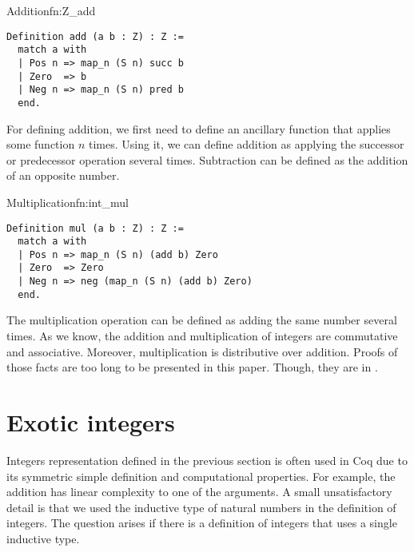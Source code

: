 \begin{func}{Addition}{fn:Z_add}
\begin{verbatim}
Definition add (a b : Z) : Z :=
  match a with 
  | Pos n => map_n (S n) succ b
  | Zero  => b
  | Neg n => map_n (S n) pred b
  end.
\end{verbatim}
\end{func}
For defining addition, we first need to define an ancillary function that applies some function $n$ times. Using it, we can define addition as applying the successor or predecessor operation several times. Subtraction can be defined as the addition of an opposite number.
\begin{func}{Multiplication}{fn:int_mul}
\begin{verbatim}
Definition mul (a b : Z) : Z :=
  match a with 
  | Pos n => map_n (S n) (add b) Zero
  | Zero  => Zero
  | Neg n => neg (map_n (S n) (add b) Zero)
  end.
\end{verbatim}
\end{func}
The multiplication operation can be defined as adding the same number several times. As we know, the addition and multiplication of integers are commutative and associative. Moreover, multiplication is distributive over addition. Proofs of those facts are too long to be presented in this paper. Though, they are in .
\section{Exotic integers}
Integers representation defined in the previous section is often used in Coq due to its symmetric simple definition and computational properties. For example, the addition has linear complexity to one of the arguments. A small unsatisfactory detail is that we used the inductive type of natural numbers in the definition of integers. The question arises if there is a definition of integers that uses a single inductive type.

